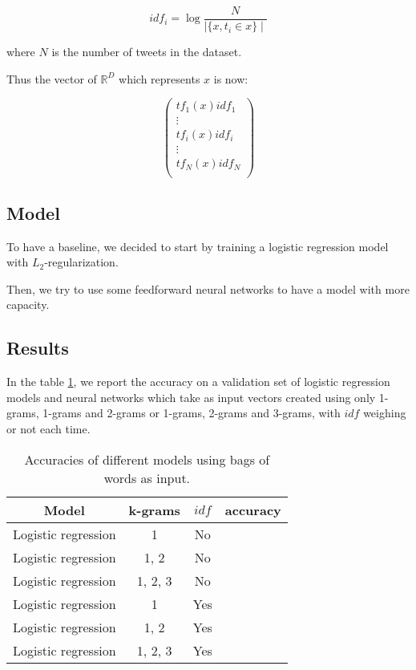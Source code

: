\documentclass[10pt,conference,compsocconf]{IEEEtran}
\begin{document}
$$
idf_i = \log{\frac{N}{\mid \{x, t_i \in x \} \mid}}
$$

where $N$ is the number of tweets in the dataset.

Thus the vector of $\mathbb{R}^D$ which represents $x$ is now:

$$
\left(
\begin{array}{c}
tf_1(x)idf_1 \\
\vdots \\
tf_i(x)idf_i \\
\vdots \\
tf_N(x)idf_N \\
\end{array}
\right)
$$

\subsection{Model}

To have a baseline, we decided to start by training a logistic regression model with $L_2$-regularization.

Then, we try to use some feedforward neural networks to have a model with more capacity.

\subsection{Results}

In the table \ref{accuracies_bow}, we report the accuracy on a validation set of logistic regression models and neural networks which take as input vectors created using only 1-grams, 1-grams and 2-grams or 1-grams, 2-grams and 3-grams, with $idf$ weighing or not each time.

\begin{table}
\begin{center}
\begin{tabular}{|c|c|c|c|}
\hline
Model & k-grams & $idf$ & accuracy \\
\hline
Logistic regression & 1 & No & \\
\hline
Logistic regression & 1, 2 & No & \\
\hline
Logistic regression & 1, 2, 3 & No & \\
\hline
Logistic regression & 1 & Yes & \\
\hline
Logistic regression & 1, 2 & Yes & \\
\hline
Logistic regression & 1, 2, 3 & Yes & \\
\hline
\end{tabular}
\label{accuracies_bow}
\caption{Accuracies of different models using bags of words as input.}
\end{center}
\end{table}
\end{document}
